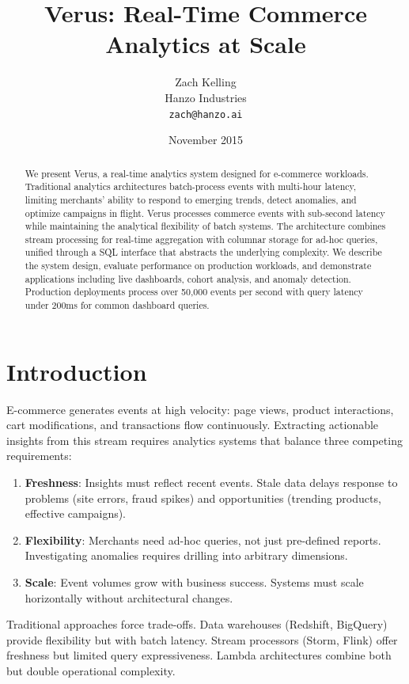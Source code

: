 \documentclass[11pt,twocolumn]{article}
\title{Verus: Real-Time Commerce Analytics at Scale}
\author{Zach Kelling\\
Hanzo Industries\\
\texttt{zach@hanzo.ai}}
\date{November 2015}
\begin{document}
\luxcoverpage

\maketitle

\begin{abstract}
We present Verus, a real-time analytics system designed for e-commerce workloads. Traditional analytics architectures batch-process events with multi-hour latency, limiting merchants' ability to respond to emerging trends, detect anomalies, and optimize campaigns in flight. Verus processes commerce events with sub-second latency while maintaining the analytical flexibility of batch systems. The architecture combines stream processing for real-time aggregation with columnar storage for ad-hoc queries, unified through a SQL interface that abstracts the underlying complexity. We describe the system design, evaluate performance on production workloads, and demonstrate applications including live dashboards, cohort analysis, and anomaly detection. Production deployments process over 50,000 events per second with query latency under 200ms for common dashboard queries.
\end{abstract}

\section{Introduction}

E-commerce generates events at high velocity: page views, product interactions, cart modifications, and transactions flow continuously. Extracting actionable insights from this stream requires analytics systems that balance three competing requirements:

\begin{enumerate}
\item \textbf{Freshness}: Insights must reflect recent events. Stale data delays response to problems (site errors, fraud spikes) and opportunities (trending products, effective campaigns).
\item \textbf{Flexibility}: Merchants need ad-hoc queries, not just pre-defined reports. Investigating anomalies requires drilling into arbitrary dimensions.
\item \textbf{Scale}: Event volumes grow with business success. Systems must scale horizontally without architectural changes.
\end{enumerate}

Traditional approaches force trade-offs. Data warehouses (Redshift, BigQuery) provide flexibility but with batch latency. Stream processors (Storm, Flink) offer freshness but limited query expressiveness. Lambda architectures \cite{marz2015} combine both but double operational complexity.
\end{document}
